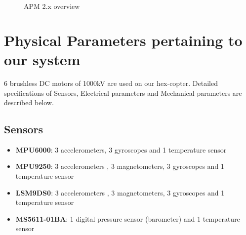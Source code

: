 \begin{figure}[t]
	\hfill
	\hfill
	\hfill
	\caption{\label{fig: 3 and 4}APM 2.x overview~\cite{19}}
\end{figure}


\section{Physical Parameters pertaining to our system}
6 brushless DC motors of 1000kV are used on our hex-copter. Detailed specifications of Sensors, Electrical parameters and Mechanical parameters are described below.
\subsection{Sensors}
\begin{itemize}
	\item \textbf{MPU6000}: 3 accelerometers, 3 gyroscopes and 1 temperature sensor
	\item \textbf{MPU9250}: 3 accelerometers , 3 magnetometers, 3 gyroscopes and 1 temperature sensor
	\item \textbf{LSM9DS0}: 3 accelerometers , 3 magnetometers, 3 gyroscopes and 1 temperature sensor
	\item \textbf{MS5611-01BA}: 1 digital pressure sensor (barometer) and 1 temperature sensor
\end{itemize}

